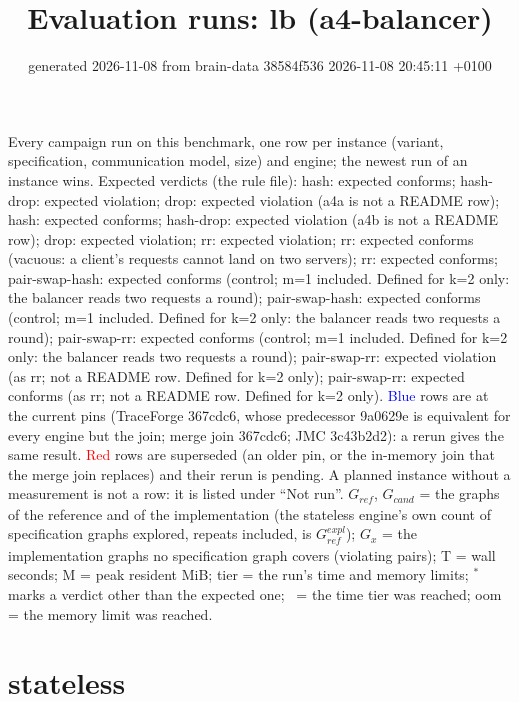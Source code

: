 \documentclass[10pt]{article}
\title{Evaluation runs: \textsf{lb} (a4-balancer)}
\author{}
\date{generated 2026-11-08 from brain-data 38584f536 2026-11-08 20:45:11 +0100}
\begin{document}
\maketitle\small
\noindent Every campaign run on this benchmark, one row per instance (variant, specification, communication model, size) and engine; the newest run of an instance wins. Expected verdicts (the rule file): hash: expected conforms; hash-drop: expected violation; drop: expected violation (a4a is not a README row); hash: expected conforms; hash-drop: expected violation (a4b is not a README row); drop: expected violation; rr: expected violation; rr: expected conforms (vacuous: a client's requests cannot land on two servers); rr: expected conforms; pair-swap-hash: expected conforms (control; m=1 included. Defined for k=2 only: the balancer reads two requests a round); pair-swap-hash: expected conforms (control; m=1 included. Defined for k=2 only: the balancer reads two requests a round); pair-swap-rr: expected conforms (control; m=1 included. Defined for k=2 only: the balancer reads two requests a round); pair-swap-rr: expected violation (as rr; not a README row. Defined for k=2 only); pair-swap-rr: expected conforms (as rr; not a README row. Defined for k=2 only). \textcolor{blue}{Blue} rows are at the current pins (TraceForge 367cdc6, whose predecessor 9a0629e is equivalent for every engine but the join; merge join 367cdc6; JMC 3c43b2d2): a rerun gives the same result. \textcolor{red}{Red} rows are superseded (an older pin, or the in-memory join that the merge join replaces) and their rerun is pending. A planned instance without a measurement is not a row: it is listed under ``Not run''. $G_{\mathit{ref}}$, $G_{\mathit{cand}}$ = the graphs of the reference and of the implementation (the stateless engine's own count of specification graphs explored, repeats included, is $G_{\mathit{ref}}^{\mathit{expl}}$); $G_x$ = the implementation graphs no specification graph covers (violating pairs); T = wall seconds; M = peak resident MiB; tier = the run's time and memory limits; $^{\ast}$ marks a verdict other than the expected one; \faClock\ = the time tier was reached; oom = the memory limit was reached.

\section*{stateless}
\end{document}

